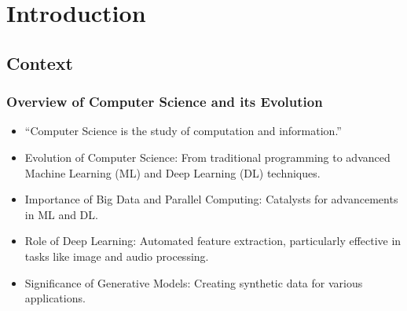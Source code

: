 \section{Introduction}

\subsection{Context}

\begin{frame}
    \frametitle{Overview of Computer Science and its Evolution}
    \begin{itemize}
        \item ``Computer Science is the study of computation and information.''~\cite{university_of_york_what_nodate}
        \item Evolution of Computer Science: From traditional programming to advanced Machine Learning (ML) and Deep Learning (DL) techniques.
        \item Importance of Big Data and Parallel Computing: Catalysts for advancements in ML and DL.
        \item Role of Deep Learning: Automated feature extraction, particularly effective in tasks like image and audio processing.
        \item Significance of Generative Models: Creating synthetic data for various applications.
    \end{itemize}
\end{frame}

